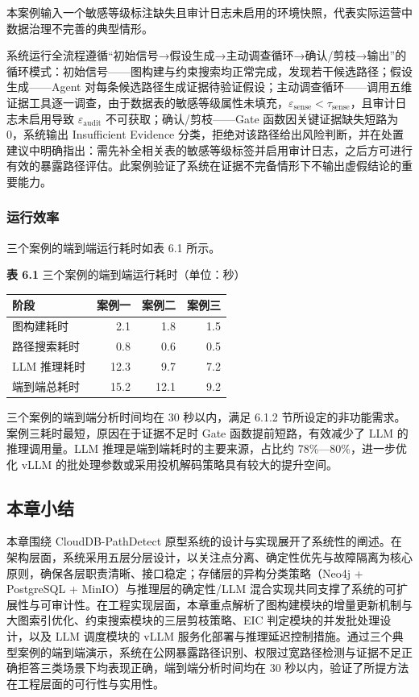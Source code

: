 \documentclass[a4paper,12pt]{ctexart}
\begin{document}
本案例输入一个敏感等级标注缺失且审计日志未启用的环境快照，代表实际运营中数据治理不完善的典型情形。

系统运行全流程遵循“初始信号→假设生成→主动调查循环→确认/剪枝→输出”的循环模式：初始信号——图构建与约束搜索均正常完成，发现若干候选路径；假设生成——Agent 对每条候选路径生成证据待验证假设；主动调查循环——调用五维证据工具逐一调查，由于数据表的敏感等级属性未填充，$\varepsilon_\text{sense} < \tau_\text{sense}$，且审计日志未启用导致 $\varepsilon_\text{audit}$ 不可获取；确认/剪枝——Gate 函数因关键证据缺失短路为 0，系统输出 Insufficient Evidence 分类，拒绝对该路径给出风险判断，并在处置建议中明确指出：需先补全相关表的敏感等级标签并启用审计日志，之后方可进行有效的暴露路径评估。此案例验证了系统在证据不完备情形下不输出虚假结论的重要能力。

\subsubsection{运行效率}

三个案例的端到端运行耗时如表 6.1 所示。

\textbf{表 6.1} 三个案例的端到端运行耗时（单位：秒）

\begin{table}[htbp]
\centering
\small
\setlength{\tabcolsep}{4pt}
\begin{tabular}{|l|r|r|r|}
\hline
\textbf{阶段} & \textbf{案例一} & \textbf{案例二} & \textbf{案例三} \\
\hline
图构建耗时 & 2.1 & 1.8 & 1.5 \\
\hline
路径搜索耗时 & 0.8 & 0.6 & 0.5 \\
\hline
LLM 推理耗时 & 12.3 & 9.7 & 7.2 \\
\hline
端到端总耗时 & 15.2 & 12.1 & 9.2 \\
\hline
\end{tabular}
\end{table}

三个案例的端到端分析时间均在 30 秒以内，满足 6.1.2 节所设定的非功能需求。案例三耗时最短，原因在于证据不足时 Gate 函数提前短路，有效减少了 LLM 的推理调用量。LLM 推理是端到端耗时的主要来源，占比约 78\%—80\%，进一步优化 vLLM 的批处理参数或采用投机解码策略具有较大的提升空间。

\subsection{本章小结}

本章围绕 CloudDB-PathDetect 原型系统的设计与实现展开了系统性的阐述。在架构层面，系统采用五层分层设计，以关注点分离、确定性优先与故障隔离为核心原则，确保各层职责清晰、接口稳定；存储层的异构分类策略（Neo4j + PostgreSQL + MinIO）与推理层的确定性/LLM 混合实现共同支撑了系统的可扩展性与可审计性。在工程实现层面，本章重点解析了图构建模块的增量更新机制与大图索引优化、约束搜索模块的三层剪枝策略、EIC 判定模块的并发批处理设计，以及 LLM 调度模块的 vLLM 服务化部署与推理延迟控制措施。通过三个典型案例的端到端演示，系统在公网暴露路径识别、权限过宽路径检测与证据不足正确拒答三类场景下均表现正确，端到端分析时间均在 30 秒以内，验证了所提方法在工程层面的可行性与实用性。
\end{document}
